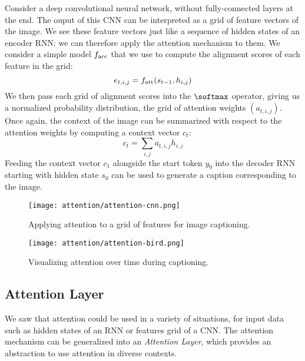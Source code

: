 Consider a deep convolutional neural network, without fully-connected layers at the end. The ouput of this CNN can be interpreted as a grid of feature vectors of the image. We see these feature vectors just like a sequence of hidden states of an encoder RNN: we can therefore apply the attention mechanism to them. We consider a simple model $f_{\textnormal{acc}}$ that we use to compute the alignment scores of each feature in the grid:
\begin{equation*}
    e_{t,i,j} = f_{\textnormal{att}}(s_{t-1}, h_{i,j})
\end{equation*}
We then pass each grid of alignment scores into the $\softmax$ operator, giving us a normalized probability distribution, the grid of attention weights $(a_{t,i,j})$. Once again, the context of the image can be summarized with respect to the attention weights by computing a context vector $c_t$:
\begin{equation*}
    c_t = \sum_{i,j} a_{t,i,j} h_{i,j}
\end{equation*} 
Feeding the context vector $c_1$ alongside the start token $y_0$ into the decoder RNN starting with hidden state $s_0$ can be used to generate a caption corresponding to the image.
\begin{figure}[H]
    \centering
    \texttt{[image: attention/attention-cnn.png]}
    \caption{Applying attention to a grid of features for image captioning.}
\end{figure}

\begin{figure}[H]
    \centering
    \texttt{[image: attention/attention-bird.png]}
    \caption{Visualizing attention over time during captioning.\protect\footnotemark}
\end{figure}

\subsection{Attention Layer}
We saw that attention could be used in a variety of situations, for input data such as hidden states of an RNN or features grid of a CNN. The attention mechanism can be generalized into an \emph{Attention Layer}, which provides an abstraction to use attention in diverse contexts.

